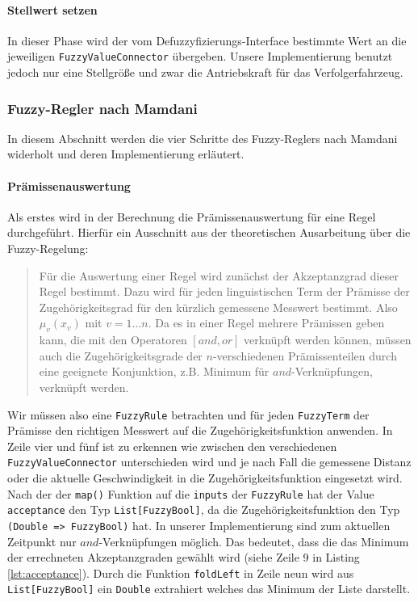 \documentclass[12pt,a4paper,bibliography=totocnumbered,listof=totocnumbered, abstracton]{scrartcl}
\def\code#1{\texttt{#1}}
\theoremstyle{Umgebung}
\begin{document}
\paragraph{Stellwert setzen}

In dieser Phase wird der vom Defuzzyfizierungs-Interface bestimmte Wert an die jeweiligen \code{FuzzyValueConnector} übergeben. Unsere Implementierung benutzt jedoch nur eine Stellgröße und zwar die Antriebskraft für das Verfolgerfahrzeug.

\label{section:fuzzy-impl}
\subsubsection{Fuzzy-Regler nach Mamdani}

In diesem Abschnitt werden die vier Schritte des Fuzzy-Reglers nach Mamdani widerholt und deren Implementierung erläutert.

\paragraph{Prämissenauswertung}

Als erstes wird in der Berechnung die Prämissenauswertung für eine Regel durchgeführt. Hierfür ein Ausschnitt aus der theoretischen Ausarbeitung über die Fuzzy-Regelung:

\begin{quote}Für die Auswertung einer Regel wird zunächst der Akzeptanzgrad dieser Regel bestimmt. Dazu wird für jeden linguistischen Term der Prämisse der Zugehörigkeitsgrad für den kürzlich gemessene Messwert bestimmt. Also $\mu_v (x_v)$ mit $v = 1...n$. Da es in einer Regel mehrere Prämissen geben kann, die mit den Operatoren $\left[and, or\right]$ verknüpft werden können, müssen auch die Zugehörigkeitsgrade der $n$-verschiedenen Prämissenteilen durch eine geeignete Konjunktion, z.B. Minimum für $and$-Verknüpfungen, verknüpft werden. \end{quote}

Wir müssen also eine \code{FuzzyRule} betrachten und für jeden \code{FuzzyTerm} der Prämisse den richtigen Messwert auf die Zugehörigkeitsfunktion anwenden. In Zeile vier und fünf ist zu erkennen wie zwischen den verschiedenen \code{FuzzyValueConnector} unterschieden wird und je nach Fall die gemessene Distanz oder die aktuelle Geschwindigkeit in die Zugehörigkeitsfunktion eingesetzt wird. Nach der der \code{map()} Funktion auf die \code{inputs} der \code{FuzzyRule} hat der Value \code{acceptance} den Typ \code{List[FuzzyBool]}, da die Zugehörigkeitsfunktion den Typ \code{(Double => FuzzyBool)} hat.  In unserer Implementierung sind zum aktuellen Zeitpunkt nur $and$-Verknüpfungen möglich. Das bedeutet, dass die das Minimum der errechneten Akzeptanzgraden gewählt wird (siehe Zeile 9 in Listing \ref{lst:acceptance}). Durch die Funktion \code{foldLeft} in Zeile neun wird aus \code{List[FuzzyBool]} ein \code{Double} extrahiert welches das Minimum der Liste darstellt.
\end{document}
